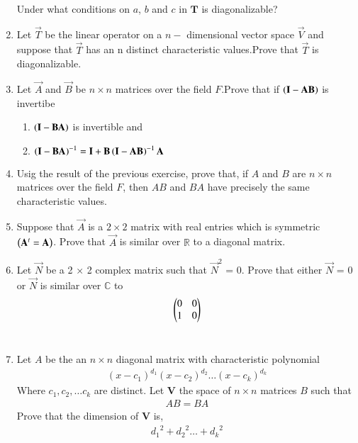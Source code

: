 \begin{enumerate}[label=\thesubsection.\arabic*.,ref=\thesubsection.\theenumi]
	Under what conditions on $a$, $b$ and $c$ in $\mathbf{T}$ is diagonalizable?
%
\\
\solution

\twocolumn
\item Let $\vec{T}$ be the linear operator on a $n-$ dimensional vector space $\vec{V}$ and suppose that  $\vec{T}$ has an n distinct characteristic values.Prove that $\vec{T}$ is diagonalizable.
%
\\
\solution

\twocolumn
\item Let $\vec{A}$ and $\vec{B}$ be $n\times n$ matrices over the field $F$.Prove that if $\left(\mathbf{I}-\mathbf{A}\mathbf{B}\right)$ is invertibe
\begin{enumerate}
    \item $\left(\mathbf{I}-\mathbf{B}\mathbf{A}\right)$ is invertible and
    \item $\left(\mathbf{I}-\mathbf{B}\mathbf{A}\right)^{-1}=\mathbf{I}+\mathbf{B}\left(\mathbf{I}-\mathbf{A}\mathbf{B}\right)^{-1}\mathbf{A}$
\end{enumerate}
%
\solution

\item Usig the result of the previous exercise, prove that, if $A$ and $B$ are $n \times n$ matrices over the field $F$, then $AB$ and $BA$ have precisely the same characteristic values.
%
\solution

\item Suppose that $\vec{A}$ is a $2\times2$ matrix with real entries which is symmetric $\left(\mathbf{A}^t=\mathbf{A}\right)$.
Prove that $\vec{A}$ is similar over $\mathbb{R}$ to a diagonal matrix. 
%
\\
\solution

\twocolumn
\item Let $\vec{N}$ be a 2 × 2 complex matrix such that $\vec{N}^2$ = 0. Prove that either $\vec{N}$ = 0 or $\vec{N}$ is similar over $\mathbb{C}$ to\\
\begin{align}
\begin{pmatrix}0&0\\1&0\end{pmatrix}
\end{align}
%
\\
\solution

\twocolumn
\item Let $A$ be the an $n \times n$ diagonal matrix with characteristic polynomial
\begin{align}
(x-c_1)^{d_1} (x-c_2)^{d_2} \dots (x-c_k)^{d_k} \label{eq:solutions/6/2/14/1.1}
\end{align}
Where $c_1, c_2,  \dots c_k $ are distinct. Let $\mathbf{V}$ the space of $n \times n$ matrices $B$ such that 
\begin{align}
AB = BA \label{eq:solutions/6/2/14/1.2}
\end{align}
Prove that the dimension of $\mathbf{V}$ is,
\begin{align}
{d_1}^2 + {d_2}^2 \dots + {d_k}^2 \label{eq:solutions/6/2/14/1.3}
\end{align}
%
%
\end{enumerate}
